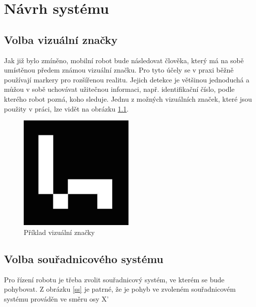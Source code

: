 \documentclass[twoside]{ctuthesis}
\theoremstyle{plain}
\theoremstyle{definition}
\theoremstyle{note}
\begin{document}
\chapter{Návrh systému}
\section{Volba vizuální značky}
Jak již bylo zmíněno, mobilní robot bude následovat člověka, který má na sobě umístěnou předem známou vizuální značku. Pro tyto účely se v praxi běžně používají markery pro rozšířenou realitu. Jejich detekce je většinou jednoduchá a můžou v sobě uchovávat užitečnou informaci, např. identifikační číslo, podle kterého robot pozná, koho sleduje. Jednu z možných vizuálních značek, které jsou použity v práci, lze vidět na obrázku \ref{am}.

\begin{figure}[H]
	\caption{Příklad vizuální značky}
	
	\label{am}
	\includegraphics[width=0.5\textwidth]{images/2/ArucoMarker.jpg}
\end{figure}

\section{Volba souřadnicového systému}

Pro řízení robotu je třeba zvolit souřadnicový systém, ve kterém se bude pohybovat. Z obrázku \ref{ss} je patrné, že je pohyb ve zvoleném souřadnicovém systému prováděn ve směru osy X'
\end{document}
